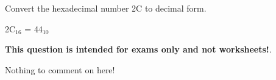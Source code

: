 

Convert the hexadecimal number 2C to decimal form.







2C$_{16}$ = 44$_{10}$







{\bf This question is intended for exams only and not worksheets!}.

Nothing to comment on here!




